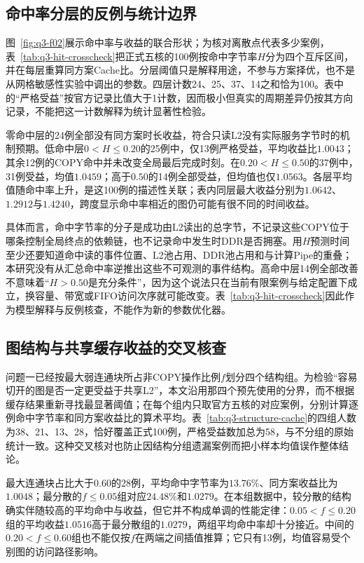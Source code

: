 \subsection{命中率分层的反例与统计边界}

图~\ref{fig:q3-f02}展示命中率与收益的联合形状；为核对离散点代表多少案例，表~\ref{tab:q3-hit-crosscheck}把正式五核的100例按命中字节率$H$分为四个互斥区间，并在每层重算同方案Cache比。分层阈值只是解释用途，不参与方案择优，也不是从网格敏感性实验中调出的参数。四层计数24、25、37、14之和恰为100。表中的“严格受益”按官方记录比值大于1计数，因而极小但真实的周期差异仍按其方向记录，不能把这一计数解释为统计显著性检验。



零命中层的24例全部没有同方案时长收益，符合只读L2没有实际服务字节时的机制预期。低命中层$0<H\leq0.20$的25例中，仅13例严格受益，平均收益比$1.0043$；其余12例的COPY命中并未改变全局最后完成时刻。在$0.20<H\leq0.50$的37例中，31例受益，均值$1.0459$；高于$0.50$的14例全部受益，但均值也仅$1.0563$。各层平均值随命中率上升，是这100例的描述性关联；表内同层最大收益分别为$1.0642$、$1.2912$与$1.4240$，跨度显示命中率相近的图仍可能有很不同的时间收益。

具体而言，命中字节率的分子是成功由L2读出的总字节，不记录这些COPY位于哪条控制全局终点的依赖链，也不记录命中发生时DDR是否拥塞。用$H$预测时间至少还要知道命中读的事件位置、L2池占用、DDR池占用和与计算Pipe的重叠；本研究没有从汇总命中率逆推出这些不可观测的事件结构。高命中层14例全部改善不意味着“$H>0.50$是充分条件”，因为这个说法只在当前有限案例与给定配置下成立，换容量、带宽或FIFO访问次序就可能改变。表~\ref{tab:q3-hit-crosscheck}因此作为模型解释与反例核查，不能作为新的参数优化器。

\subsection{图结构与共享缓存收益的交叉核查}

问题一已经按最大弱连通块所占非COPY操作比例$f$划分四个结构组。为检验“容易切开的图是否一定更受益于共享L2”，本文沿用那四个预先使用的分界，而不根据缓存结果重新寻找最显著阈值；在每个组内只取官方五核的对应案例，分别计算逐例命中字节率和同方案收益比的算术平均。表~\ref{tab:q3-structure-cache}的四组人数为38、21、13、28，恰好覆盖正式100例，严格受益数加总为58，与不分组的原始统计一致。这种交叉核对也防止因结构分组遗漏案例而把小样本均值误作整体结论。



最大连通块占比大于$0.60$的28例，平均命中字节率为$13.76\%$、同方案收益比为$1.0048$；最分散的$f\leq0.05$组对应$24.48\%$和$1.0279$。在本组数据中，较分散的结构确实伴随较高的平均命中与收益，但它并不构成单调的性能定律：$0.05<f\leq0.20$组的平均收益$1.0516$高于最分散组的$1.0279$，两组平均命中率却十分接近。中间的$0.20<f\leq0.60$组也不能仅按$f$在两端之间插值推算；它只有13例，均值容易受个别图的访问路径影响。

